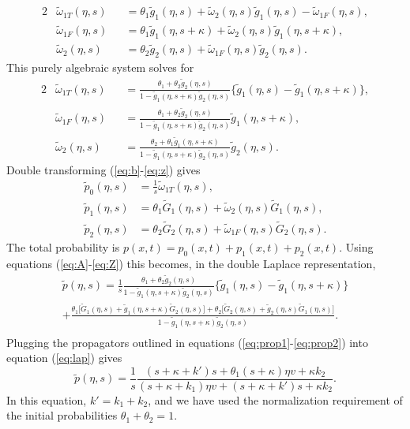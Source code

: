 \documentclass[]{agujournal2018}
\newcommand\be{\begin{equation}}
\newcommand\ee{\end{equation}}
\newcommand\tom{\tilde{\omega}}
\newcommand\tg{\tilde{g}}
\newcommand\tp{\tilde{p}}
\newcommand\tG{\tilde{G}}
\begin{document}
\begin{alignat}{2}
&\tom_{1T}(\eta,s) &&= \theta_1 \tg_1(\eta,s) + \tom_2(\eta,s)\tg_1(\eta,s)-\tom_{1F}(\eta,s),\\
&\tom_{1F}(\eta,s) &&= \theta_1\tg_1(\eta,s+\kappa) + \tom_2(\eta,s)\tg_1(\eta,s+\kappa),\\
&\tom_2(\eta,s) &&= \theta_2 \tg_2(\eta,s) + \tom_{1F}(\eta,s)\tg_2(\eta,s).
\end{alignat}
This purely algebraic system solves for 
\begin{alignat}{2}
&\tom_{1T}(\eta,s) &&= \frac{\theta_1 + \theta_2 \tg_2(\eta,s)}{1-\tg_1(\eta,s+\kappa)\tg_2(\eta,s)}\big\{\tg_1(\eta,s)-\tg_1(\eta,s+\kappa) \big\}, \label{eq:A} \\
&\tom_{1F}(\eta,s) &&= \frac{\theta_1 + \theta_2 \tg_2(\eta,s)}{1-\tg_1(\eta,s+\kappa)\tg_2(\eta,s)}\tg_1(\eta,s+\kappa),\\
&\tom_{2}(\eta,s) &&= \frac{\theta_2 + \theta_1 \tg_1(\eta,s+\kappa)}{1-\tg_1(\eta,s+\kappa)\tg_2(\eta,s)}\tg_2(\eta,s). 
\end{alignat}
Double transforming (\ref{eq:b}-\ref{eq:z}) gives
\begin{align}
\tp_0(\eta,s) &= \frac{1}{s}\tom_{1T}(\eta,s),\\
\tp_1(\eta,s) &= \theta_1 \tG_1(\eta,s) + \tom_2(\eta,s) \tG_1(\eta,s),\\
\tp_2(\eta,s) &= \theta_2 \tG_2(\eta,s) + \tom_{1F}(\eta,s)\tG_2(\eta,s).\label{eq:Z}
\end{align}
The total probability is $p(x,t) = p_0(x,t) + p_1(x,t) + p_2(x,t)$. Using equations (\ref{eq:A}-\ref{eq:Z}) this becomes, in the double Laplace representation, 
\begin{multline}
\tp(\eta,s) = \frac{1}{s}\frac{\theta_1 + \theta_2 \tg_2(\eta,s)}{1-\tg_1(\eta,s+\kappa)\tg_2(\eta,s)}\big\{\tg_1(\eta,s)-\tg_1(\eta,s+\kappa) \big\} \\
+\frac{\theta_1\big[\tG_1(\eta,s) + \tg_1(\eta,s+\kappa)\tG_2(\eta,s)\big]+ \theta_2\big[\tG_2(\eta,s) + \tg_2(\eta,s)\tG_1(\eta,s)\big]}{1-\tg_1(\eta,s+\kappa)\tg_2(\eta,s)}. \\
\label{eq:lap}
\end{multline}
Plugging the propagators outlined in equations (\ref{eq:prop1}-\ref{eq:prop2}) into equation (\ref{eq:lap}) gives 
\be \tilde{p}(\eta,s) = \frac{1}{s}\frac{(s+\kappa + k')s  + \theta_1(s+\kappa )\eta v+ \kappa k_2}{(s+\kappa+k_1)\eta v+(s+\kappa+k')s + \kappa k_2}.\label{eq:nicedist}\ee
In this equation, $k'=k_1+k_2$, and we have used the normalization requirement of the initial probabilities $\theta_1 + \theta_2 = 1.$
\end{document}
